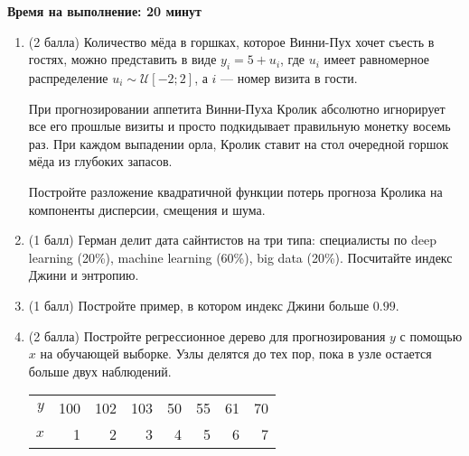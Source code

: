 \documentclass[12pt]{article} %
\theoremstyle{definition} %
\begin{document}
\textbf{Время на выполнение: 20 минут}

\begin{enumerate}

\item (2 балла) Количество мёда в горшках, которое Винни-Пух хочет съесть в гостях, можно представить в виде $y_i = 5 + u_i$, где $u_i$ имеет равномерное распределение $u_i \sim \mathcal{U}[-2;2]$, а $i$ — номер визита в гости.

При прогнозировании аппетита Винни-Пуха Кролик абсолютно игнорирует все его прошлые визиты и просто подкидывает правильную монетку восемь раз. При каждом выпадении орла, Кролик ставит на стол очередной горшок мёда из глубоких запасов.

Постройте разложение квадратичной функции потерь прогноза Кролика на компоненты дисперсии, смещения и шума.




\item (1 балл) Герман делит дата сайнтистов на три типа: специалисты по deep learning (20\%), machine learning (60\%), big data (20\%). Посчитайте индекс Джини и энтропию.

\item (1 балл) Постройте пример, в котором индекс Джини больше $0.99$.


\item (2 балла) Постройте регрессионное дерево для прогнозирования $y$ с помощью $x$ на обучающей выборке. Узлы делятся до тех пор, пока в узле остается больше двух наблюдений.

\begin{tabular}{rrrrrrrr}
\toprule
$y$ & 100 & 102 & 103 & 50  & 55 & 61 & 70  \\
$x$ & 1 & 2 & 3 & 4  & 5 & 6 & 7  \\
\bottomrule
\end{tabular}

\end{enumerate}
\end{document}
